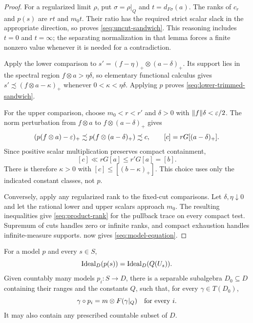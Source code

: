 \begin{proof}
For a regularized limit \(\rho\), put \(\sigma=\rho|_Q\) and
\(t=d_{F\sigma}(a)\). The ranks of \(c_r\) and \(p(s)\) are
\(rt\) and \(m_0t\). Their ratio has the required strict scalar
slack in the appropriate direction, so
 proves \eqref{seq:uncut-sandwich}.
This reasoning includes \(t=0\) and \(t=\infty\); the separating
normalization in that lemma forces a finite nonzero value whenever
it is needed for a contradiction.

Apply the lower comparison to
\(s'=(f-\eta)_+\otimes(a-\delta)_+\).
Its support lies in the spectral region \(f\otimes a>\eta\delta\),
so elementary functional calculus gives
\(s'\precsim(f\otimes a-\kappa)_+\) whenever
\(0<\kappa<\eta\delta\). Applying \(p\) proves
\eqref{seq:lower-trimmed-sandwich}.

For the upper comparison, choose
\(m_0<r<r'\) and \(\delta>0\) with
\(\|f\|\delta<\varepsilon/2\). The norm perturbation from \(f\otimes a\)
to \(f\otimes(a-\delta)_+\) gives
\[
 (p(f\otimes a)-\varepsilon)_+
 \precsim p(f\otimes(a-\delta)_+)
 \precsim c,
 \qquad [c]=rG[(a-\delta)_+].
\]
Since positive scalar multiplication preserves compact containment,
\[
 [c]\ll rG[a]\leq r'G[a]=[b].
\]
There is therefore \(\kappa>0\) with
\([c]\leq[(b-\kappa)_+]\). This choice uses only the indicated
constant classes, not \(p\).

Conversely, apply any regularized rank to the fixed-cut comparisons.
Let \(\delta,\eta\downarrow0\) and let the rational lower and
upper scalars approach \(m_0\). The resulting inequalities give
\eqref{seq:product-rank} for the pullback trace on every compact
test. Supremum of cuts handles zero or infinite ranks, and compact
exhaustion handles infinite-measure supports.
 now gives
\eqref{seq:model-equation}.
\end{proof}

\begin{corollary}\label{seq:all-traces}
For a model \(p\) and every \(s\in S\),
\begin{equation}\label{seq:constant-ideal}
 \operatorname{Ideal}_D(p(s))=\operatorname{Ideal}_D(Q(U_s)).
\end{equation}
Given countably many models \(p_i:S\to D\), there is a separable
subalgebra \(D_0\subseteq D\) containing their ranges and the
constants \(Q\), such that, for every \(\gamma\in T(D_0)\),
\begin{equation}\label{seq:all-trace-model-equation}
 \gamma\circ p_i=m\otimes F(\gamma|_Q)
 \quad\hbox{for every }i.
\end{equation}
It may also contain any prescribed countable subset of \(D\).
\end{corollary}

